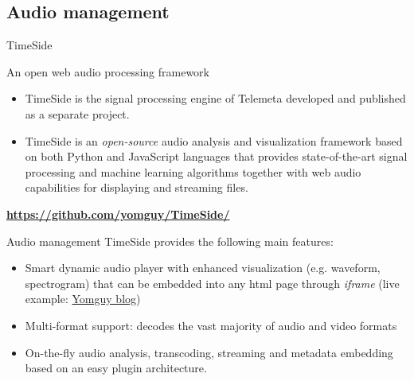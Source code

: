 \documentclass[final, hyperref, table]{beamer}
\begin{document}
\subsection{Audio management}
\begin{frame}{TimeSide}\scriptsize
 \begin{block}{An open web audio processing framework}
   \begin{itemize}
   \item TimeSide is the \alert{signal processing engine} of Telemeta developed and published as a separate project.
   \item TimeSide is an
     \emph{open-source} \alert{audio analysis and visualization framework} based on
     both \alert{Python} and \alert{JavaScript} languages that provides
     state-of-the-art signal processing and machine learning
     algorithms together with \alert{web audio} capabilities for displaying
     and streaming files.
   \end{itemize}
\vspace{-0.5cm}\begin{center}
  \colorbox{yellow!40}{\bf \url{https://github.com/yomguy/TimeSide/} }
\end{center}
\end{block}
\begin{block}{Audio management}
  TimeSide provides the following main features:
  \begin{itemize}
   \item Smart dynamic audio player with enhanced visualization (e.g. waveform,
    spectrogram) that can be embedded into any html page through \emph{iframe} (live example: \href{http://yomix.org/telemeta-1-embedded-timeside-player.html}{Yomguy blog})
  \item Multi-format support: decodes the vast majority of audio and
    video formats%
  \item On-the-fly audio analysis, transcoding, streaming and metadata embedding
    based on an easy plugin architecture.
  \end{itemize}
\end{block}

 
\end{frame} 
\end{document}
